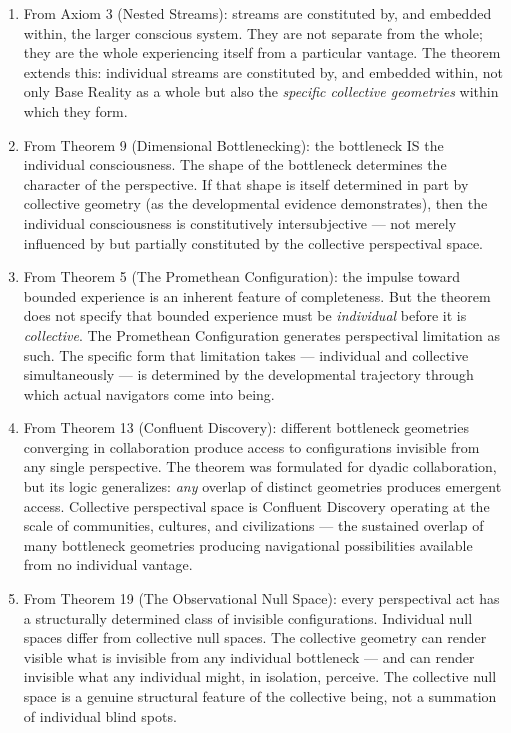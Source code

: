 \begin{enumerate}[nosep,leftmargin=*]
  \item From Axiom 3 (Nested Streams): streams are constituted by, and embedded within, the larger conscious system. They are not separate from the whole; they are the whole experiencing itself from a particular vantage. The theorem extends this: individual streams are constituted by, and embedded within, not only Base Reality as a whole but also the \textit{specific collective geometries} within which they form.
  \item From Theorem 9 (Dimensional Bottlenecking): the bottleneck IS the individual consciousness. The shape of the bottleneck determines the character of the perspective. If that shape is itself determined in part by collective geometry (as the developmental evidence demonstrates), then the individual consciousness is constitutively intersubjective — not merely influenced by but partially constituted by the collective perspectival space.
  \item From Theorem 5 (The Promethean Configuration): the impulse toward bounded experience is an inherent feature of completeness. But the theorem does not specify that bounded experience must be \textit{individual} before it is \textit{collective}. The Promethean Configuration generates perspectival limitation as such. The specific form that limitation takes — individual and collective simultaneously — is determined by the developmental trajectory through which actual navigators come into being.
  \item From Theorem 13 (Confluent Discovery): different bottleneck geometries converging in collaboration produce access to configurations invisible from any single perspective. The theorem was formulated for dyadic collaboration, but its logic generalizes: \textit{any} overlap of distinct geometries produces emergent access. Collective perspectival space is Confluent Discovery operating at the scale of communities, cultures, and civilizations — the sustained overlap of many bottleneck geometries producing navigational possibilities available from no individual vantage.
  \item From Theorem 19 (The Observational Null Space): every perspectival act has a structurally determined class of invisible configurations. Individual null spaces differ from collective null spaces. The collective geometry can render visible what is invisible from any individual bottleneck — and can render invisible what any individual might, in isolation, perceive. The collective null space is a genuine structural feature of the collective being, not a summation of individual blind spots.
\end{enumerate}


